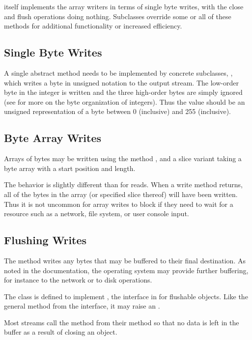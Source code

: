  itself implements the array writers in terms of
single byte writes, with the close and flush operations doing nothing.
Subclasses override some or all of these methods for additional
functionality or increased efficiency.


\subsection{Single Byte Writes}

A single abstract method needs to be implemented by concrete
subclasses, , which writes a byte in unsigned
notation to the output stream.  The low-order byte in the integer is
written and the three high-order bytes are simply ignored (see
 for more on the byte organization of integers).
Thus the value should be an unsigned representation of a byte between
0 (inclusive) and 255 (inclusive).

\subsection{Byte Array Writes}

Arrays of bytes may be written using the method ,
and a slice variant taking a byte array with a start position and
length.

The behavior is slightly different than for reads.  When a write
method returns, all of the bytes in the array (or specified slice
thereof) will have been written.  Thus it is not uncommon for array
writes to block if they need to wait for a resource such as a network,
file system, or user console input.

\subsection{Flushing Writes}

The method  writes any bytes that may be buffered
to their final destination.  As noted in the documentation, the
operating system may provide further buffering, for instance to
the network or to disk operations.  

The  class is defined to implement
, the interface in  for flushable
objects.  Like the general  method from the
 interface, it may raise an .

Most streams call the  method from their 
method so that no data is left in the buffer as a result of closing
an object.


